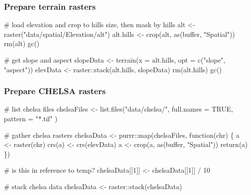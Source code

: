 \documentclass[]{article}
\newenvironment{Shaded}{}{}
\newcommand{\CommentTok}[1]{\textcolor[rgb]{0.00,0.50,0.00}{#1}}
\newcommand{\ControlFlowTok}[1]{\textcolor[rgb]{0.00,0.00,1.00}{#1}}
\newcommand{\DataTypeTok}[1]{#1}
\newcommand{\DecValTok}[1]{#1}
\newcommand{\KeywordTok}[1]{\textcolor[rgb]{0.00,0.00,1.00}{#1}}
\newcommand{\NormalTok}[1]{#1}
\newcommand{\OperatorTok}[1]{#1}
\newcommand{\OtherTok}[1]{\textcolor[rgb]{1.00,0.25,0.00}{#1}}
\newcommand{\StringTok}[1]{\textcolor[rgb]{0.00,0.50,0.50}{#1}}
\begin{document}
\hypertarget{prepare-terrain-rasters}{%
\subsubsection{Prepare terrain rasters}\label{prepare-terrain-rasters}}

\begin{Shaded}
\begin{Highlighting}[]
\CommentTok{# load elevation and crop to hills size, then mask by hills}
\NormalTok{alt <-}\StringTok{ }\KeywordTok{raster}\NormalTok{(}\StringTok{"data/spatial/Elevation/alt"}\NormalTok{)}
\NormalTok{alt.hills <-}\StringTok{ }\KeywordTok{crop}\NormalTok{(alt, }\KeywordTok{as}\NormalTok{(buffer, }\StringTok{"Spatial"}\NormalTok{))}
\KeywordTok{rm}\NormalTok{(alt)}
\KeywordTok{gc}\NormalTok{()}

\CommentTok{# get slope and aspect}
\NormalTok{slopeData <-}\StringTok{ }\KeywordTok{terrain}\NormalTok{(}\DataTypeTok{x =}\NormalTok{ alt.hills, }\DataTypeTok{opt =} \KeywordTok{c}\NormalTok{(}\StringTok{"slope"}\NormalTok{, }\StringTok{"aspect"}\NormalTok{))}
\NormalTok{elevData <-}\StringTok{ }\NormalTok{raster}\OperatorTok{::}\KeywordTok{stack}\NormalTok{(alt.hills, slopeData)}
\KeywordTok{rm}\NormalTok{(alt.hills)}
\KeywordTok{gc}\NormalTok{()}
\end{Highlighting}
\end{Shaded}

\hypertarget{prepare-chelsa-rasters}{%
\subsubsection{Prepare CHELSA rasters}\label{prepare-chelsa-rasters}}

\begin{Shaded}
\begin{Highlighting}[]
\CommentTok{# list chelsa files}
\NormalTok{chelsaFiles <-}\StringTok{ }\KeywordTok{list.files}\NormalTok{(}\StringTok{"data/chelsa/"}\NormalTok{,}
  \DataTypeTok{full.names =} \OtherTok{TRUE}\NormalTok{,}
  \DataTypeTok{pattern =} \StringTok{"*.tif"}
\NormalTok{)}

\CommentTok{# gather chelsa rasters}
\NormalTok{chelsaData <-}\StringTok{ }\NormalTok{purrr}\OperatorTok{::}\KeywordTok{map}\NormalTok{(chelsaFiles, }\ControlFlowTok{function}\NormalTok{(chr) \{}
\NormalTok{  a <-}\StringTok{ }\KeywordTok{raster}\NormalTok{(chr)}
  \KeywordTok{crs}\NormalTok{(a) <-}\StringTok{ }\KeywordTok{crs}\NormalTok{(elevData)}
\NormalTok{  a <-}\StringTok{ }\KeywordTok{crop}\NormalTok{(a, }\KeywordTok{as}\NormalTok{(buffer, }\StringTok{"Spatial"}\NormalTok{))}
  \KeywordTok{return}\NormalTok{(a)}
\NormalTok{\})}

\CommentTok{# is this in reference to temp?}
\NormalTok{chelsaData[[}\DecValTok{1}\NormalTok{]] <-}\StringTok{ }\NormalTok{chelsaData[[}\DecValTok{1}\NormalTok{]] }\OperatorTok{/}\StringTok{ }\DecValTok{10}

\CommentTok{# stack chelsa data}
\NormalTok{chelsaData <-}\StringTok{ }\NormalTok{raster}\OperatorTok{::}\KeywordTok{stack}\NormalTok{(chelsaData)}
\end{Highlighting}
\end{Shaded}
\end{document}
